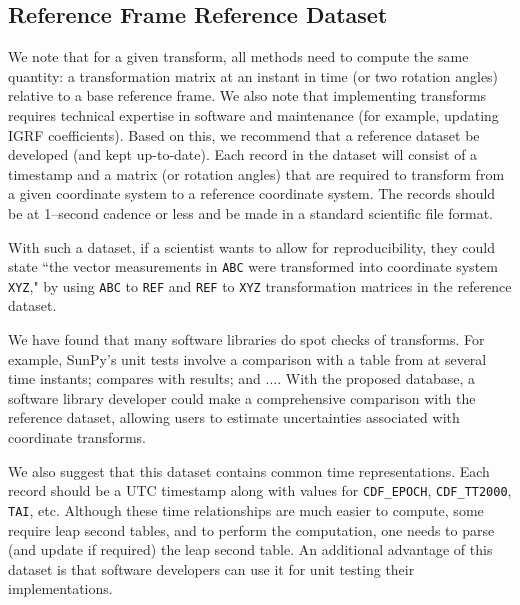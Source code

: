 \documentclass[draft]{agujournal2019}
\begin{document}
\subsection{Reference Frame Reference Dataset}

We note that for a given transform, all methods need to compute the same quantity: a transformation matrix at an instant in time (or two rotation angles) relative to a base reference frame. We also note that implementing transforms requires technical expertise in software and maintenance (for example, updating IGRF coefficients). Based on this, we recommend that a reference dataset be developed (and kept up-to-date). Each record in the dataset will consist of a timestamp and a matrix (or rotation angles) that are required to transform from a given coordinate system to a reference coordinate system. The records should be at 1--second cadence or less and be made in a standard scientific file format.

With such a dataset, if a scientist wants to allow for reproducibility, they could state ``the vector measurements in \texttt {ABC} were transformed into coordinate system \texttt {XYZ}," by using \texttt {ABC} to \texttt {REF} and \texttt {REF} to \texttt {XYZ} transformation matrices in the reference dataset.

We have found that many software libraries do spot checks of transforms. For example, SunPy's unit tests \cite{SunPy} involve a comparison with a table from  at several time instants; \cite{cxform} compares with  results; and .... With the proposed database, a software library developer could make a comprehensive comparison with the reference dataset, allowing users to estimate uncertainties associated with coordinate transforms.

We also suggest that this dataset contains common time representations. Each record should be a UTC timestamp along with values for \texttt{CDF\_EPOCH}, \texttt{CDF\_TT2000}, \texttt{TAI}, etc. Although these time relationships are much easier to compute, some require leap second tables, and to perform the computation, one needs to parse (and update if required) the leap second table. An additional advantage of this dataset is that software developers can use it for unit testing their implementations.


\end{document}
